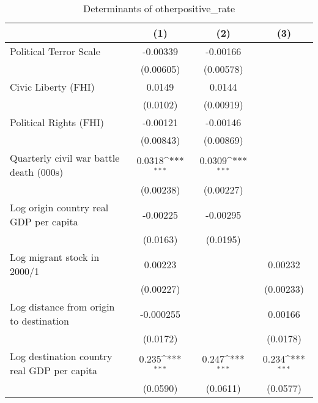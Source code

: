 \begin{table}[htbp]\centering
\def\sym#1{\ifmmode^{#1}\else\(^{#1}\)\fi}
\caption{Determinants of otherpositive\_rate}
\begin{tabular}{l*{3}{c}}
\hline\hline
                    &\multicolumn{1}{c}{(1)}         &\multicolumn{1}{c}{(2)}         &\multicolumn{1}{c}{(3)}         \\
\hline
Political Terror Scale&    -0.00339         &    -0.00166         &                     \\
                    &   (0.00605)         &   (0.00578)         &                     \\
[1em]
Civic Liberty (FHI) &      0.0149         &      0.0144         &                     \\
                    &    (0.0102)         &   (0.00919)         &                     \\
[1em]
Political Rights (FHI)&    -0.00121         &    -0.00146         &                     \\
                    &   (0.00843)         &   (0.00869)         &                     \\
[1em]
Quarterly civil war battle death (000s)&      0.0318\sym{***}&      0.0309\sym{***}&                     \\
                    &   (0.00238)         &   (0.00227)         &                     \\
[1em]
Log origin country real GDP per capita&    -0.00225         &    -0.00295         &                     \\
                    &    (0.0163)         &    (0.0195)         &                     \\
[1em]
Log migrant stock in 2000/1&     0.00223         &                     &     0.00232         \\
                    &   (0.00227)         &                     &   (0.00233)         \\
[1em]
Log distance from origin to destination&   -0.000255         &                     &     0.00166         \\
                    &    (0.0172)         &                     &    (0.0178)         \\
[1em]
Log destination country real GDP per capita&       0.235\sym{***}&       0.247\sym{***}&       0.234\sym{***}\\
                    &    (0.0590)         &    (0.0611)         &    (0.0577)         \\

\end{tabular}
\end{table}
